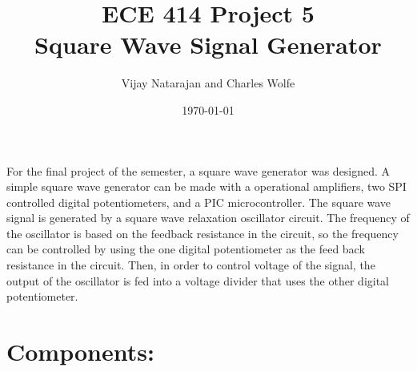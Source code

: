 \documentclass[12pt]{article}
\begin{document}
\title{ECE 414 Project 5\\Square Wave Signal Generator}%
\author{Vijay Natarajan and Charles Wolfe}%
\date{\today}%
\maketitle	For the final project of the semester, a square wave generator was designed. A simple square wave generator can be made with a operational amplifiers, two SPI controlled digital potentiometers, and a PIC microcontroller. The square wave signal is generated by a square wave relaxation oscillator circuit. The frequency of the oscillator is based on the feedback resistance in the circuit, so the frequency can be controlled by using the one digital potentiometer as the feed back resistance in the circuit. Then, in order to control voltage of the signal, the output of the oscillator is fed into a voltage divider that uses the other digital potentiometer.
\section{Components:}
\end{document}
